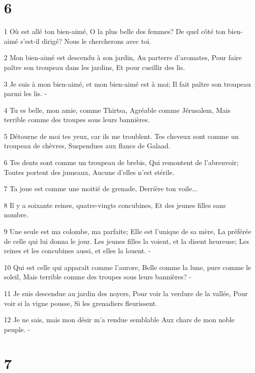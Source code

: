 \chapter{6}

\par 1 Où est allé ton bien-aimé, O la plus belle des femmes? De quel côté ton bien-aimé s'est-il dirigé? Nous le chercherons avec toi.
\par 2 Mon bien-aimé est descendu à son jardin, Au parterre d'aromates, Pour faire paître son troupeau dans les jardins, Et pour cueillir des lis.
\par 3 Je suis à mon bien-aimé, et mon bien-aimé est à moi; Il fait paître son troupeau parmi les lis. -
\par 4 Tu es belle, mon amie, comme Thirtsa, Agréable comme Jérusalem, Mais terrible comme des troupes sous leurs bannières.
\par 5 Détourne de moi tes yeux, car ils me troublent. Tes cheveux sont comme un troupeau de chèvres, Suspendues aux flancs de Galaad.
\par 6 Tes dents sont comme un troupeau de brebis, Qui remontent de l'abreuvoir; Toutes portent des jumeaux, Aucune d'elles n'est stérile.
\par 7 Ta joue est comme une moitié de grenade, Derrière ton voile...
\par 8 Il y a soixante reines, quatre-vingts concubines, Et des jeunes filles sans nombre.
\par 9 Une seule est ma colombe, ma parfaite; Elle est l'unique de sa mère, La préférée de celle qui lui donna le jour. Les jeunes filles la voient, et la disent heureuse; Les reines et les concubines aussi, et elles la louent. -
\par 10 Qui est celle qui apparaît comme l'aurore, Belle comme la lune, pure comme le soleil, Mais terrible comme des troupes sous leurs bannières? -
\par 11 Je suis descendue au jardin des noyers, Pour voir la verdure de la vallée, Pour voir si la vigne pousse, Si les grenadiers fleurissent.
\par 12 Je ne sais, mais mon désir m'a rendue semblable Aux chars de mon noble peuple. -

\chapter{7}

